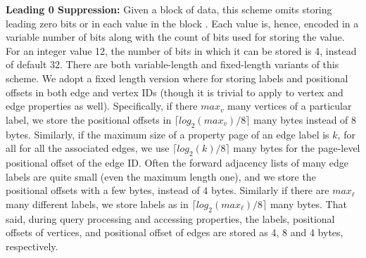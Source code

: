 \noindent  \textbf{Leading 0 Suppression:} Given a block of data, this scheme omits storing leading zero bits or in each value in the block \cite{beckmann:sparse}. Each value is, hence, encoded in a variable number of bits along with the count of bits used for storing the value. For an integer value 12, the number of bits in which it can be stored is 4, instead of default 32. There are both variable-length and fixed-length variants of this scheme. We adopt a fixed length version where for storing labels and positional offsets in both edge and vertex IDs (though it is trivial to apply to vertex and edge properties as well). Specifically, if there $max_v$ many vertices of a particular label, we store the positional offsets in $\lceil log_2(max_v)/8\rceil$ many bytes instead of 8 bytes. Similarly, if the maximum size of a property page of an edge label is $k$, for all for all the associated edges, we use $\lceil log_2(k)/8\rceil$ many bytes for the page-level positional offset of the edge ID. Often the forward adjacency lists of many edge labels are quite small (even the maximum length one), and we store the positional offsets with a few bytes, instead of 4 bytes. Similarly if there are $max_{\ell}$ many different labels, we store labels as in $\lceil log_2(max_{\ell})/8\rceil$ many bytes. That said, during query processing and accessing properties, the  labels, positional offsets of vertices, and positional offset of edges are stored as 4, 8 and 4 bytes, respectively.


	
